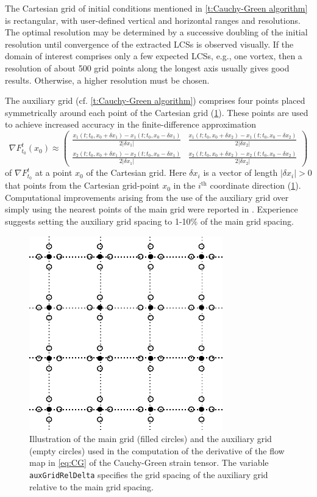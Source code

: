 \documentclass{elsarticle}
\begin{document}
The Cartesian grid of initial conditions mentioned in \cref{t:Cauchy-Green algorithm} is rectangular, with user-defined vertical and horizontal ranges and resolutions. The optimal resolution may be determined by a successive doubling of the initial resolution until convergence of the extracted LCSs is observed visually. If the domain of interest comprises only a few expected LCSs, e.g., one vortex, then a resolution of about 500 grid points along the longest axis usually gives good results. Otherwise, a higher resolution must be chosen.

The auxiliary grid (cf. \cref{t:Cauchy-Green algorithm}) comprises four points placed symmetrically around each point of the Cartesian grid (\cref{f:main and auxiliary grids}). These points are used to achieve increased accuracy in the finite-difference approximation
\[
\nabla F_{t_0}^t(x_0) \approx
\left(\begin{array}{cc}
\frac{x_1(t;t_0,x_0 + \delta x_1) - x_1(t;t_0,x_0 - \delta x_1)}{2\vert\delta x_1\vert} & \frac{x_1(t;t_0,x_0+\delta x_2) - x_1(t;t_0,x_0-\delta x_2)}{2\vert\delta x_2\vert}\\
\frac{x_2(t;t_0,x_0+\delta x_1) - x_2(t;t_0,x_0 - \delta x_1)}{2\vert\delta x_1\vert} & \frac{x_2(t;t_0,x_0 + \delta x_2) - x_2(t;t_0,x_0 - \delta x_2)}{2\vert\delta x_2\vert}
\end{array}\right)
\]
of $\nabla F_{t_0}^t$ at a point $x_0$ of the Cartesian grid. Here $\delta x_i$ is a vector of length $\vert\delta x_i\vert > 0$ that points from the Cartesian grid-point $x_0$ in the $i^\text{th}$ coordinate direction (\cref{f:main and auxiliary grids}). Computational improvements arising from the use of the auxiliary grid over simply using the nearest points of the main grid were reported in \citet{farazmand12:_comput_lagran}. Experience suggests setting the auxiliary grid spacing to 1-10\% of the main grid spacing.

\begin{figure}
\begin{center}
\includegraphics[width=.5\textwidth]{graphics/main_aux_grids}
\end{center}
\caption{Illustration of the main grid (filled circles) and the auxiliary grid (empty circles) used in the computation of the derivative of the flow map in \cref{eq:CG} of the Cauchy-Green strain tensor. The variable \lstinline!auxGridRelDelta! specifies the grid spacing of the auxiliary grid relative to the main grid spacing.}
\label{f:main and auxiliary grids}
\end{figure}
\end{document}
